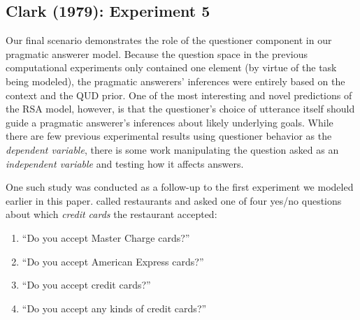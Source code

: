 \documentclass[12pt, floatsintext, jou]{apa6}
\begin{document}
\subsection{Clark (1979): Experiment 5}
Our final scenario demonstrates the role of the questioner component in our pragmatic answerer model. Because the question space in the previous computational experiments only contained one element (by virtue of the task being modeled), the pragmatic answerers' inferences were entirely based on the context and the QUD prior. One of the most interesting and novel predictions of the RSA model, however, is that the questioner's choice of utterance itself should guide a pragmatic answerer's inferences about likely underlying goals. While there are few previous experimental results using questioner behavior as the \emph{dependent variable}, there is some work manipulating the question asked as an \emph{independent variable} and testing how it affects answers.

One such study was conducted as a follow-up to the first experiment we modeled earlier in this paper.   called restaurants and asked one of four yes/no questions about which \emph{credit cards} the restaurant accepted:

\begin{enumerate}
\item ``Do you accept Master Charge cards?'' 
\item ``Do you accept American Express cards?''
\item ``Do you accept credit cards?'' 
\item ``Do you accept any kinds of credit cards?'' 
\end{enumerate}
\end{document}

